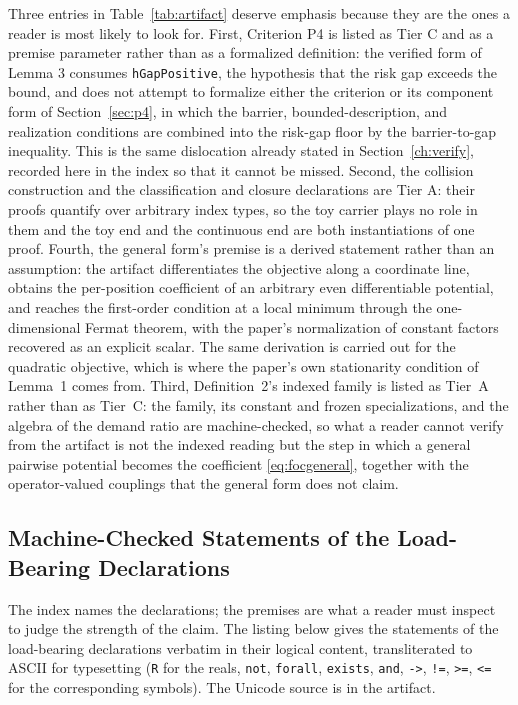 Three entries in Table~\ref{tab:artifact} deserve emphasis because they are the ones a reader is most likely to look for. First, Criterion P4 is listed as Tier C and as a premise parameter rather than as a formalized definition: the verified form of Lemma 3 consumes \texttt{hGapPositive}, the hypothesis that the risk gap exceeds the bound, and does not attempt to formalize either the criterion or its component form of Section~\ref{sec:p4}, in which the barrier, bounded-description, and realization conditions are combined into the risk-gap floor by the barrier-to-gap inequality. This is the same dislocation already stated in Section~\ref{ch:verify}, recorded here in the index so that it cannot be missed. Second, the collision construction and the classification and closure declarations are Tier A: their proofs quantify over arbitrary index types, so the toy carrier plays no role in them and the toy end and the continuous end are both instantiations of one proof. Fourth, the general form's premise is a derived statement rather than an assumption: the artifact differentiates the objective along a coordinate line, obtains the per-position coefficient of an arbitrary even differentiable potential, and reaches the first-order condition at a local minimum through the one-dimensional Fermat theorem, with the paper's normalization of constant factors recovered as an explicit scalar. The same derivation is carried out for the quadratic objective, which is where the paper's own stationarity condition of Lemma~1 comes from. Third, Definition~2's indexed family is listed as Tier~A rather than as Tier~C: the family, its constant and frozen specializations, and the algebra of the demand ratio are machine-checked, so what a reader cannot verify from the artifact is not the indexed reading but the step in which a general pairwise potential becomes the coefficient \eqref{eq:focgeneral}, together with the operator-valued couplings that the general form does not claim.

\subsection{Machine-Checked Statements of the Load-Bearing Declarations}

The index names the declarations; the premises are what a reader must inspect to judge the strength of the claim. The listing below gives the statements of the load-bearing declarations verbatim in their logical content, transliterated to ASCII for typesetting (\texttt{R} for the reals, \texttt{not}, \texttt{forall}, \texttt{exists}, \texttt{and}, \texttt{->}, \texttt{!=}, \texttt{>=}, \texttt{<=} for the corresponding symbols). The Unicode source is in the artifact.

